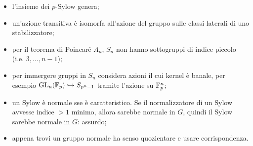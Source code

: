 \begin{itemize}
    \item l'insieme dei $p$-Sylow genera;
    \item un'azione transitiva è isomorfa all'azione del gruppo sulle classi laterali di uno stabilizzatore;
    \item per il teorema di Poincaré $A_n$, $S_n$ non hanno sottogruppi di indice piccolo (i.e. $3, \dots, n-1$);
    \item per immergere gruppi in $S_n$ considera azioni il cui kernel è banale, per esempio $\text{GL}_n(\mathbb{F}_p) \hookrightarrow S_{p^n - 1}$ tramite l'azione su $\mathbb{F}_p^n$;
    \item un Sylow è normale sse è caratteristico. Se il normalizzatore di un Sylow avvesse indice $>1$ minimo, allora sarebbe normale in $G$, quindi il Sylow sarebbe normale in $G$: assurdo;
    \item appena trovi un gruppo normale ha senso quozientare e usare corrispondenza.
\end{itemize}